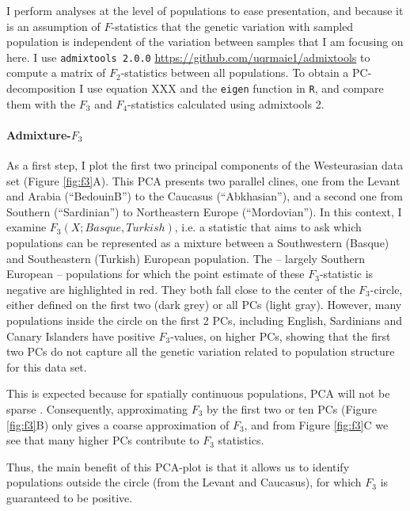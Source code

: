 \documentclass[12pt,a4pape, fullpage]{article}
\begin{document}
I perform analyses at the level of populations to ease presentation, and because it is an assumption of $F$-statistics that the genetic variation with sampled population is independent of the variation between samples that I am focusing on here. I use \texttt{admixtools 2.0.0} \url{https://github.com/uqrmaie1/admixtools} to compute a matrix of $F_2$-statistics between all populations. To obtain a PC-decomposition I use equation XXX and the \texttt{eigen} function in \texttt{R}, and compare them with the $F_3$ and $F_4$-statistics calculated using admixtools 2.

\paragraph{Admixture-$F_3$}
As a first step, I plot the first two principal components of the Westeurasian data set (Figure \ref{fig:f3}A). This PCA presents two parallel clines, one from the Levant and Arabia (``BedouinB'') to the Caucasus (``Abkhasian''), and a second one from Southern (``Sardinian'') to Northeastern Europe (``Mordovian''). In this context, I examine $F_3(X; Basque, Turkish)$, i.e. a statistic that aims to ask which populations can be represented as a mixture between a Southwestern (Basque) and Southeastern (Turkish) European population. The -- largely Southern European -- populations for which the point estimate of these $F_3$-statistic is negative are highlighted in red. They both fall close to the center of the $F_3$-circle, either defined on the first two (dark grey) or all PCs (light gray). However, many populations inside the circle on the first 2 PCs, including English, Sardinians and Canary Islanders have positive $F_3$-values, on higher PCs, showing that the first two PCs do not capture all the genetic variation related to population structure for this data set. 

This is expected because for spatially continuous populations, PCA will not be sparse \citep{novembre2008a}.  Consequently, approximating $F_3$ by the first two or ten PCs (Figure \ref{fig:f3}B) only gives a coarse approximation of $F_3$, and from Figure \ref{fig:f3}C we see that many higher PCs contribute to $F_3$ statistics.

Thus, the main benefit of this PCA-plot is that it allows us to identify populations outside the circle (from the Levant and Caucasus), for which $F_3$ is guaranteed to be positive.
\end{document}
